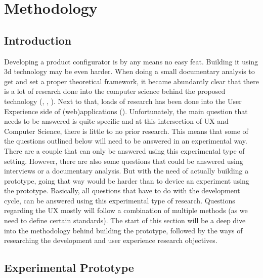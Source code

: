 

\chapter{Methodology}
\section{Introduction}
Developing a product configurator is by any means no easy feat. Building it using 3d technology may be even harder. When doing a small documentary analysis to get and set a proper theoretical framework, it became abundantly clear that there is a lot of research done into the computer science behind the proposed technology (\cite{openGLsite}, \cite{microservices}, \cite{heteregoneousComputingTechniques}). Next to that, loads of research has been done into the User Experience side of (web)applications (\cite{nielsonNormanReports}). Unfortunately, the main question that needs to be answered is quite specific and at this intersection of UX and Computer Science, there is little to no prior research. This means that some of the questions outlined below will need to be answered in an experimental way. There are a couple that can only be answered using this experimental type of setting. However, there are also some questions that could be answered using interviews or a documentary analysis. But with the need of actually building a prototype, going that way would be harder than to device an experiment using the prototype.
Basically, all questions that have to do with the development cycle, can be answered using this experimental type of research. Questions regarding the UX mostly will follow a combination of multiple methods (as we need to define certain standards). The start of this section will be a deep dive into the methodology behind building the prototype, followed by the ways of researching the development and user experience research objectives.

\section{Experimental Prototype}
